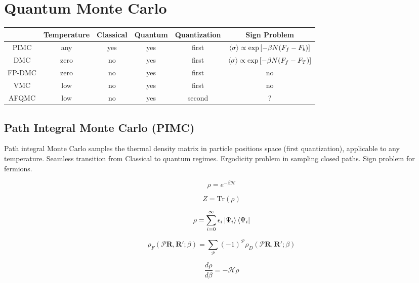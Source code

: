 \documentclass[draftthesis,fullpage]{uiucthesis}
\newcommand{\toprule}{\hline\hline}
\newcommand{\midrule}{\hline}
\newcommand{\bottomrule}{\hline\hline}
\newcommand{\bs}{\boldsymbol}
\newcommand{\ham}{\mathcal{H}}
\begin{document}
\section{Quantum Monte Carlo}
\begin{table}[h]
\centering
\begin{tabular}{cccccc}
\toprule
     & Temperature & Classical & Quantum & Quantization & Sign Problem \\
\midrule
PIMC &     any     &   yes     &   yes   & first & $\braket{\sigma}\propto \exp\left[ -\beta N (F_f-F_b) \right]$ \\
DMC  &    zero     &    no     &   yes   & first & $\braket{\sigma}\propto \exp\left[ -\beta N (F_f-F_T) \right]$ \\
FP-DMC & zero & no & yes & first & no \\
VMC & low & no & yes & first & no \\
AFQMC & low & no & yes & second & ? \\
\bottomrule
\end{tabular}
\end{table}

\subsection{Path Integral Monte Carlo (PIMC)}
Path integral Monte Carlo samples the thermal density matrix in particle positions space (first quantization), applicable to any temperature. Seamless transition from Classical to quantum regimes. Ergodicity problem in sampling closed paths. Sign problem for fermions.

\begin{equation}
\rho = e^{-\beta \ham}
\end{equation}

\begin{equation}
Z = \text{Tr} \left( \rho \right)
\end{equation}

\begin{equation}
\rho = \sum\limits_{i=0}^\infty \epsilon_i \ket{\Psi_i}\bra{\Psi_i} 
\end{equation}

\begin{equation}
\rho_F(\mathcal{P}\bs{R}, \bs{R}'; \beta) = \sum\limits_{\mathcal{P}} (-1)^{\mathcal{P}} \rho_D (\mathcal{P}\bs{R}, \bs{R}'; \beta)
\end{equation}

\begin{equation}
\dfrac{d\rho}{d\beta} = -\ham \rho
\end{equation}
\end{document}

